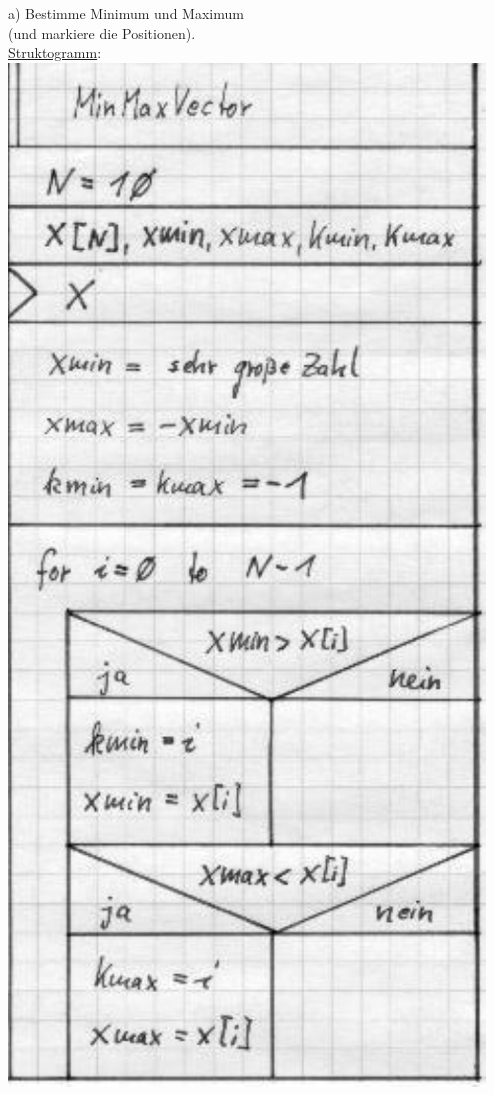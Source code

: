 \begin{minipage}[t]{0.45\textwidth}
  a) Bestimme Minimum und Maximum \\(und markiere die Positionen). \\[1ex]
%
 \underline{Struktogramm}: \\
 \includegraphics[scale=0.58]{GIF/p49a}
\end{minipage}
